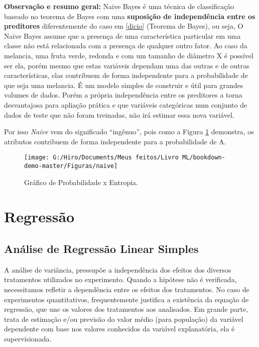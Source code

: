 \documentclass[
]{book}
\begin{document}
\textbf{Observação e resumo geral:} Naive Bayes é uma técnica de classificação baseado no teorema de Bayes com uma \textbf{suposição de independência entre os preditores} diferentemente do caso em \ref{dicio} (Teorema de Bayes), ou seja, O Naive Bayes assume que a presença de uma característica particular em uma classe não está relacionada com a presença de qualquer outro fator. Ao caso da melancia, uma fruta verde, redonda e com um tamanho de diâmetro X é possível ser ela, porém mesmo que estas variáveis dependam uma das outras e de outras características, elas contribuem de forma independente para a probabilidade de que seja uma melancia. É um modelo simples de construir e útil para grandes volumes de dados. Porém a própria independência entre os preditores a torna desvantajosa para apliação prática e que variáveis categóricas num conjunto de dados de teste que não foram treinadas, não irá estimar essa nova variável.

Por isso \emph{Naive} vem do significado ``ingênuo'', pois como a Figura \ref{fig:naive} demonstra, os atributos contribuem de forma independente para a probabilidade de A.

\begin{figure}

{\centering \texttt{[image: G:/Hiro/Documents/Meus feitos/Livro ML/bookdown-demo-master/Figuras/naive]} 

}

\caption{Gráfico de Probabilidade x Entropia.}\label{fig:naive}
\end{figure}



\hypertarget{reg}{%
\section{Regressão}\label{reg}}

\hypertarget{reglin}{%
\subsection{Análise de Regressão Linear Simples}\label{reglin}}

A análise de variância, pressupõe a independência dos efeitos dos diversos tratamentos utilizados no experimento. Quando a hipótese não é verificada, necessitamos refletir a dependência entre os efeitos dos tratamentos. No caso de experimentos quantitativos, frequentemente justifica a existência da equação de regressão, que une os valores dos tratamentos aos analisados. Em grande parte, trata de estimação e/ou previsão do valor médio (para população) da variável dependente com base nos valores conhecidos da variável explanatória, ela é supervisionada.
\end{document}
